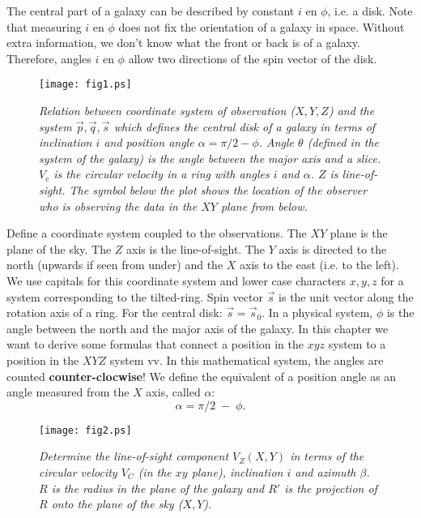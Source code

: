 \documentclass[11pt,a4paper]{article}
\begin{document}
 
The central part of a galaxy can be described by constant $i$ en $\phi$, i.e.
a disk. Note that measuring $i$ en $\phi$ does not fix the orientation
of a galaxy in space. Without extra information, we don't know what the front 
or back is of a galaxy. Therefore, angles $i$ en $\phi$
allow two directions of the spin vector of the disk. 

\begin{figure}
   \centering
   \texttt{[image: fig1.ps]}
   \caption{\it Relation between coordinate system of observation ($X,Y,Z$) and the 
    system $\vec p, \vec q, \vec s$ which defines the central disk of a galaxy in 
    terms of inclination $i$ and position angle $ \alpha = \pi /2 - \phi$. Angle 
    $\theta$ (defined in the system of the galaxy) is the angle between the 
    major axis and a slice. $V_c$ is the circular velocity in a ring with 
    angles $i$ and $\alpha$. $Z$ is line-of-sight. The symbol below the plot shows
    the location of the observer who is observing the data in the $XY$ plane from
    below.}
   \label{fig:fig1}
\end{figure}

Define a coordinate system coupled to the observations. 
The $XY$ plane is the plane of the sky. The $Z$ axis is the line-of-sight. 
The $Y$ axis is directed to the north (upwards if seen from under) and the 
$X$ axis to 
the east (i.e. to the left). We use capitals for this coordinate system 
and lower case characters $x,y,z$ for a system corresponding to 
the tilted-ring. Spin vector $\vec s$ is the unit vector along the rotation
axis of a ring.
For the central disk: ${\vec s} = {\vec s}_0$. In a physical system, $\phi$
is the angle between the north and the major axis of the galaxy. In this
chapter we want to derive some formulas that connect a position in the $xyz$ 
system to a position in the $XYZ$ system vv. In this mathematical system,
the angles are counted {\bf counter-clocwise}!
We define the equivalent of a position angle as an 
angle measured from the $X$ axis, called $\alpha$:
$$ \alpha = \pi /2 \; - \; \phi. $$

\begin{figure}
   \centering
   \texttt{[image: fig2.ps]}
   \caption{\it Determine the line-of-sight component $V_Z(X,Y)$ in terms of the 
     circular velocity $V_C$ (in the $xy$ plane), inclination $i$ 
     and azimuth $\beta$. $R$ is the radius in the plane of the galaxy and $R'$
     is the projection of $R$ onto the plane of the sky ($X,Y$).}
   \label{fig:fig2}
\end{figure}
\end{document}
